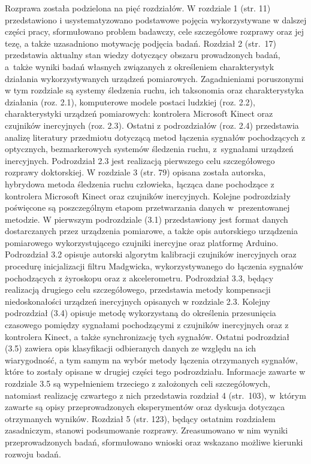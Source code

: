 \documentclass[10pt,a4paper]{article}
\begin{document}
Rozprawa została podzielona na pięć rozdziałów. W rozdziale 1 (str. 11) przedstawiono i usystematyzowano podstawowe pojęcia wykorzystywane w dalszej części pracy, sformułowano problem badawczy, cele szczegółowe rozprawy oraz jej tezę, a także uzasadniono motywację podjęcia badań. Rozdział 2 (str.~17) przedstawia aktualny stan wiedzy dotyczący obszaru prowadzonych badań, a~także wyniki badań własnych związanych z określeniem charakterystyk działania wykorzystywanych urządzeń pomiarowych. Zagadnieniami poruszonymi w tym rozdziale są systemy śledzenia ruchu, ich taksonomia oraz charakterystyka działania (roz. 2.1), komputerowe modele postaci ludzkiej (roz. 2.2), charakterystyki urządzeń pomiarowych: kontrolera Microsoft Kinect oraz czujników inercyjnych (roz. 2.3). Ostatni z podrozdziałów (roz. 2.4) przedstawia analizę literatury przedmiotu dotyczącą metod łączenia sygnałów pochodzących z optycznych, bezmarkerowych systemów śledzenia ruchu, z~sygnałami urządzeń inercyjnych. Podrozdział 2.3 jest realizacją pierwszego celu szczegółowego rozprawy doktorskiej. W rozdziale 3 (str. 79) opisana została autorska, hybrydowa metoda śledzenia ruchu człowieka, łącząca dane pochodzące z kontrolera Microsoft Kinect oraz czujników inercyjnych. Kolejne podrozdziały poświęcone są poszczególnym etapom przetwarzania danych w~prezentowanej metodzie. W pierwszym podrozdziale (3.1) przedstawiony jest format danych dostarczanych przez urządzenia pomiarowe, a także opis autorskiego urządzenia pomiarowego wykorzystującego czujniki inercyjne oraz platformę Arduino. Podrozdział 3.2 opisuje autorski algorytm kalibracji czujników inercyjnych oraz procedurę inicjalizacji filtru Madgwicka, wykorzystywanego do łączenia sygnałów pochodzących z żyroskopu oraz z akcelerometru. Podrozdział 3.3, będący realizacją drugiego celu szczegółowego, przedstawia metody kompensacji niedoskonałości urządzeń inercyjnych opisanych w rozdziale 2.3. Kolejny podrozdział (3.4) opisuje metodę wykorzystaną do określenia przesunięcia czasowego pomiędzy sygnałami pochodzącymi z czujników inercyjnych oraz z kontrolera Kinect, a także synchronizację tych sygnałów. Ostatni podrozdział (3.5) zawiera opis klasyfikacji odbieranych danych ze względu na ich wiarygodność, a tym samym na wybór metody łączenia otrzymanych sygnałów, które to zostały opisane w drugiej części tego podrozdziału. Informacje zawarte w rozdziale 3.5 są wypełnieniem trzeciego z założonych celi szczegółowych, natomiast realizację czwartego z nich przedstawia rozdział 4 (str.~103), w~którym zawarte są opisy przeprowadzonych eksperymentów oraz dyskusja dotycząca otrzymanych wyników. Rozdział 5 (str. 123), będący ostatnim rozdziałem zasadniczym, stanowi podsumowanie rozprawy. Zreasumowano w nim wyniki przeprowadzonych badań, sformułowano wnioski oraz wskazano możliwe kierunki rozwoju badań.
\end{document}
